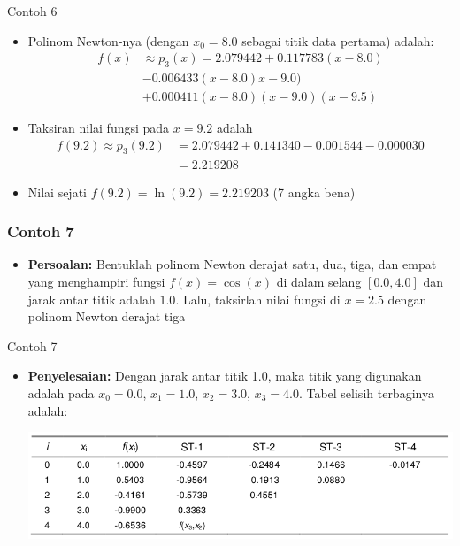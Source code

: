 \documentclass[pdflatex,compress,mathserif]{beamer}
\begin{document}
\begin{frame}{Contoh 6}
	\begin{itemize}
		\item Polinom Newton-nya (dengan $ x_0 = 8.0 $ sebagai titik data pertama) adalah:
		\begin{align*}
			f(x) &\approx p_3(x) = 2.079442 + 0.117783(x - 8.0)\\
			&- 0.006433(x - 8.0)x - 9.0) \\
			&+ 0.000411(x - 8.0)(x - 9.0)(x - 9.5)
		\end{align*}
		\item Taksiran nilai fungsi pada $ x = 9.2 $ adalah
		\begin{align*}
			f(9.2) \approx p_3(9.2) &= 2.079442 + 0.141340 - 0.001544 - 0.000030 \\
			&= 2.219208
		\end{align*}
		\item Nilai sejati $ f(9.2) = \ln(9.2) = 2.219203 $ (7 angka bena)
	\end{itemize}
\end{frame}

\begin{frame}
	\frametitle{Contoh 7}
	\begin{itemize}
		\item \textbf{Persoalan:} Bentuklah polinom Newton derajat satu, dua, tiga, dan empat yang menghampiri fungsi $ f(x) = \cos(x) $ di dalam selang $ [0.0 , 4.0] $ dan jarak antar titik adalah $ 1.0 $. Lalu, taksirlah nilai fungsi di $ x = 2.5 $ dengan polinom Newton derajat tiga
	\end{itemize}
\end{frame}

\begin{frame}{Contoh 7}
	\begin{itemize}
		\item \textbf{Penyelesaian:} Dengan jarak antar titik 1.0, maka titik yang digunakan adalah pada $ x_0 = 0.0 $, $ x_1 = 1.0 $, $ x_2 = 3.0 $, $ x_3 = 4.0 $. Tabel selisih terbaginya adalah:
		\begin{center}
			\includegraphics[width=\linewidth]{img/img14}
		\end{center}
	\end{itemize}
\end{frame}
\end{document}
